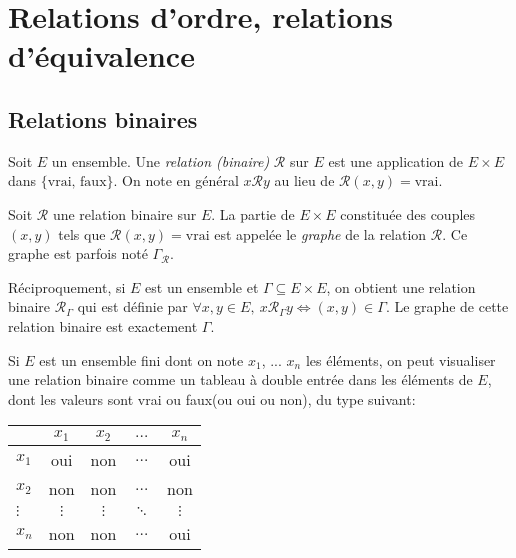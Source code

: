 \chapter{Relations d'ordre, relations d'équivalence}
\minitoc
\hyperlink{toc}{\retourTOC}


\section{Relations binaires}


\begin{definition}
Soit $E$ un ensemble. Une \emph{relation (binaire)} ${\mathcal R}$ sur $E$ est une application de $E\times E$ dans $\{\text{vrai, faux}\}$. On note en général \og$x{\mathcal R}y$\fg{} au lieu de \og${\mathcal R}(x,y)=\text{vrai}$\fg{}.
\end{definition}

\begin{definition}
Soit $\mathcal R$ une relation binaire sur $E$. La partie de $E\times E$ constituée des couples $(x,y)$ tels que ${\mathcal R}(x,y)=\text{vrai}$ est appelée le \emph{graphe} de la relation $\mathcal R$. Ce graphe est parfois noté $\Gamma_{\mathcal R}$.

Réciproquement, si $E$ est un ensemble et $\Gamma \subseteq E\times E$, on obtient une relation binaire ${\mathcal R}_\Gamma$ qui est définie par $\forall x, y\in E, \: x{\mathcal R}_\Gamma y \iff (x,y)\in \Gamma$. Le graphe de cette relation binaire est exactement $\Gamma$.
\end{definition}






Si $E$ est un ensemble fini dont on note $x_1$, ... $x_n$ les éléments, on peut visualiser une relation binaire comme un tableau à double entrée dans les éléments de $E$, dont les valeurs sont \og vrai\fg{} ou \og faux\fg (ou \og oui\fg{} ou \og non\fg), du type suivant:

\begin{center}
\begin{tabular}{|l|c|c|c|c|}\hline
		& $x_1$ & $x_2$ & $\dots$ & $x_n$ \\ \hline
$x_1$ 	& oui & non & $\dots$ & oui \\ \hline
$x_2$ 	& non & non & $\dots$ & non \\ \hline
$\vdots$& $\vdots$ & $\vdots$ &  $\ddots$ & $\vdots$ \\ \hline
$x_n$	& non & non & $\dots$ & oui \\ \hline
\end{tabular}
\end{center}

